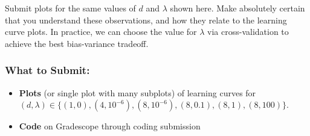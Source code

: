 \documentclass{article}
\begin{document}
\begin{aprob}
    Submit plots for the same values of $d$ and $\lambda$ shown here. Make absolutely certain that you understand these observations, and how they relate to the learning curve plots.  In practice, we can choose the value for $\lambda$ via cross-validation to achieve the best bias-variance tradeoff.
    
    \subsubsection*{What to Submit:}
    \begin{itemize}
        \item \textbf{Plots} (or single plot with many subplots) of learning curves for \\$(d, \lambda) \in \{(1, 0), (4,10^{-6}), (8, 10^{-6}), (8, 0.1), (8, 1), (8, 100)\}$.
        \item \textbf{Code} on Gradescope through coding submission
    \end{itemize}
\end{aprob}
\end{document}

